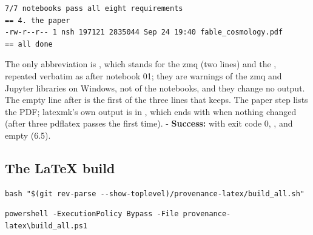 \begin{Verbatim}
7/7 notebooks pass all eight requirements
== 4. the paper
-rw-r--r-- 1 nsh 197121 2835044 Sep 24 19:40 fable_cosmology.pdf
== all done
\end{Verbatim}

The only abbreviation is , which stands for the zmq  (two lines) and the , repeated verbatim as after notebook 01; they are warnings of the zmq and Jupyter libraries on Windows, not of the notebooks, and they change no output. The empty line after  is the first of the three lines that  keeps. The paper step lists the PDF; latexmk's own output is in , which ends with  when nothing changed (after three pdflatex passes the first time). - \textbf{Success:}  with exit code 0, , and  empty (6.5).

\subsection{The LaTeX build}
\label{sec:6.9}

\begin{Verbatim}
bash "$(git rev-parse --show-toplevel)/provenance-latex/build_all.sh"
\end{Verbatim}

\begin{Verbatim}
powershell -ExecutionPolicy Bypass -File provenance-latex\build_all.ps1
\end{Verbatim}

